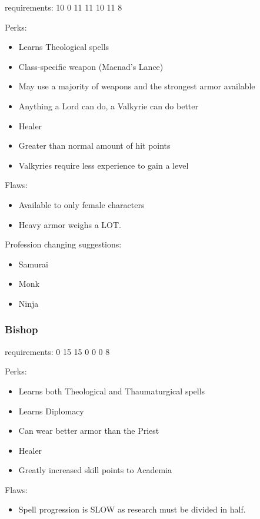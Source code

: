 \documentclass[12pt]{article}
\providecommand{\tightlist}{%
  \setlength{\itemsep}{0pt}\setlength{\parskip}{0pt}}
\newcommand{\WviiTwoColumnSetup}{\raggedcolumns\RaggedRight}
\begin{document}
requirements: 10 0 11 11 10 11 8

\begin{multicols}{2}\WviiTwoColumnSetup
Perks:

\begin{itemize}
\item
  Learns Theological spells
\item
  Class-specific weapon (Maenad's Lance)
\item
  May use a majority of weapons and the strongest armor available
\item
  Anything a Lord can do, a Valkyrie can do better
\item
  Healer
\item
  Greater than normal amount of hit points
\item
  Valkyries require less experience to gain a level
\end{itemize}
\columnbreak

Flaws:

\begin{itemize}
\item
  Available to only female characters
\item
  Heavy armor weighs a LOT.
\end{itemize}
\end{multicols}

Profession changing suggestions:

\begin{itemize}
\item
  Samurai
\item
  Monk
\item
  Ninja
\end{itemize}

\subsubsection{Bishop}\label{bishop}

requirements: 0 15 15 0 0 0 8

\begin{multicols}{2}\WviiTwoColumnSetup
Perks:

\begin{itemize}
\item
  Learns both Theological and Thaumaturgical spells
\item
  Learns Diplomacy
\item
  Can wear better armor than the Priest
\item
  Healer
\item
  Greatly increased skill points to Academia
\end{itemize}
\columnbreak

Flaws:

\begin{itemize}
\tightlist
\item
  Spell progression is SLOW as research must be divided in half.
\end{itemize}
\end{multicols}
\end{document}
